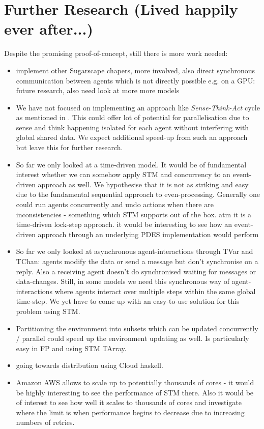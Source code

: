 \section{Further Research (Lived happily ever after...)}
Despite the promising proof-of-concept, still there is more work needed:

\begin{itemize}
	\item implement other Sugarscape chapers, more involved, also direct synchronous communication between agents which is not directly possible e.g. on a GPU: future research, also need look at more more models
	\item We have not focused on implementing an approach like \textit{Sense-Think-Act} cycle as mentioned in \cite{xiao_survey_2018}. This could offer lot of potential for parallelisation due to sense and think happening isolated for each agent without interfering with global shared data. We expect additional speed-up from such an approach but leave this for further research.
	\item So far we only looked at a time-driven model. It would be of fundamental interest whether we can somehow apply STM and concurrency to an event-driven approach as well. We hypothesise that it is not as striking and easy due to the fundamental sequential approach to even-processing. Generally one could run agents concurrently and undo actions when there are inconsistencies - something which STM supports out of the box. atm it is a time-driven lock-step approach. it would be interesting to see how an event-driven approach through an underlying PDES implementation would perform
	\item So far we only looked at asynchronous agent-interactions through TVar and TChan: agents modify the data or send a message but don't synchronise on a reply. Also a receiving agent doesn't do synchronised waiting for messages or data-changes. Still, in some models we need this synchronous way of agent-interactions where agents interact over multiple steps within the same global time-step. We yet have to come up with an easy-to-use solution for this problem using STM.
	\item Partitioning the environment into subsets which can be updated concurrently / parallel could speed up the environment updating as well. Is particularly easy in FP and using STM TArray.
	\item going towards distribution using Cloud haskell.
	\item Amazon AWS allows to scale up to potentially thousands of cores - it would be highly interesting to see the performance of STM there. Also it would be of interest to see how well it scales to thousands of cores and investigate where the limit is when performance begins to decrease due to increasing numbers of retries.
\end{itemize}
